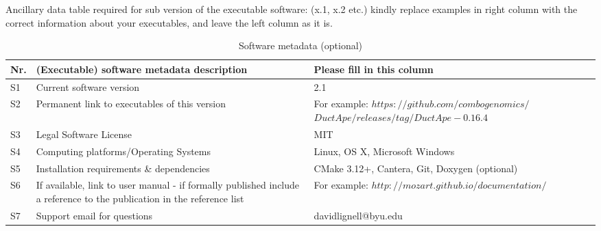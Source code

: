 \documentclass[preprint,12pt, a4paper]{elsarticle}
\begin{document}
Ancillary data table required for sub version of the executable software: (x.1, x.2 etc.) kindly replace examples in right column with the correct information about your executables, and leave the left column as it is.

\begin{table}[!h]
\begin{tabular}{|l|p{6.5cm}|p{6.5cm}|}
\hline
\textbf{Nr.} & \textbf{(Executable) software metadata description} & \textbf{Please fill in this column} \\
\hline
S1 & Current software version & 2.1 \\
\hline
S2 & Permanent link to executables of this version  & For example: $https://github.com/combogenomics/$ $DuctApe/releases/tag/DuctApe-0.16.4$ \\
\hline
S3 & Legal Software License & MIT \\
\hline
S4 & Computing platforms/Operating Systems & Linux, OS X, Microsoft Windows\\
\hline
S5 & Installation requirements \& dependencies & CMake 3.12+, Cantera, Git, Doxygen (optional) \\
\hline
S6 & If available, link to user manual - if formally published include a reference to the publication in the reference list & For example: $http://mozart.github.io/documentation/$ \\
\hline
S7 & Support email for questions & davidlignell@byu.edu \\
\hline
\end{tabular}
\caption{Software metadata (optional)}
\end{table}
\end{document}
